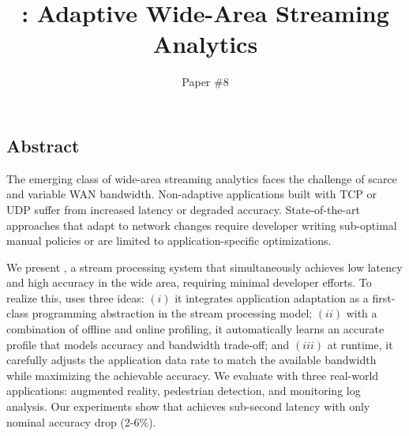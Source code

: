 \documentclass[twocolumn]{article}
\begin{document}
\title{\sysname{}: Adaptive Wide-Area Streaming Analytics}
\author{Paper \#8}
\date{}
\maketitle

\subsection*{Abstract}

The emerging class of wide-area streaming analytics faces the challenge of
scarce and variable WAN bandwidth. Non-adaptive applications built with TCP or
UDP suffer from increased latency or degraded accuracy. State-of-the-art
approaches that adapt to network changes require developer writing sub-optimal
manual policies or are limited to application-specific optimizations.

We present \sysname{}, a stream processing system that simultaneously achieves
low latency and high accuracy in the wide area, requiring minimal developer
efforts. To realize this, \sysname{} uses three ideas: $(i)$ it integrates
application adaptation as a first-class programming abstraction in the stream
processing model; $(ii)$ with a combination of offline and online profiling, it
automatically learns an accurate profile that models accuracy and bandwidth
trade-off; and $(iii)$ at runtime, it carefully adjusts the application data
rate to match the available bandwidth while maximizing the achievable
accuracy. We evaluate \sysname{} with three real-world applications: augmented
reality, pedestrian detection, and monitoring log analysis. Our experiments show
that \sysname{} achieves sub-second latency with only nominal accuracy drop
(2-6\%).










% 

\balance

{\footnotesize 
}

% 
\end{document}
